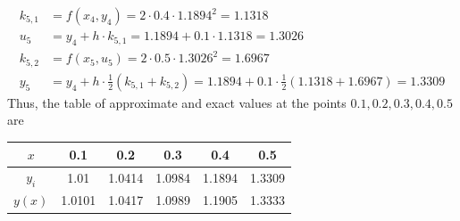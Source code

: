 \documentclass{article}
\begin{document}
\begin{enumerate}
\begin{enumerate}[(a)]
\begin{soln}
\begin{align*}
						k_{5, 1} &= f(x_4, y_4) = 2\cdot 0.4\cdot 1.1894^2 = 1.1318 \\
						u_5 &= y_4 + h\cdot k_{5, 1} = 1.1894 + 0.1\cdot 1.1318 = 1.3026 \\
						k_{5, 2} &= f(x_5, u_5) = 2\cdot 0.5\cdot 1.3026^2 = 1.6967 \\
						y_5 &= y_4 + h\cdot \frac{1}{2}\left( k_{5, 1} + k_{5, 2} \right) = 1.1894 + 0.1\cdot \frac{1}{2}\left( 1.1318 + 1.6967 \right) = 1.3309
					\end{align*}
					Thus, the table of approximate and exact values at the points $0.1, 0.2, 0.3, 0.4, 0.5$ are
					\begin{center}
						\begin{tabular}{c||c|c|c|c|c}
							$x$ & 0.1 & 0.2 & 0.3 & 0.4 & 0.5 \\
							\hline
							$y_i$ & 1.01 & 1.0414 & 1.0984 & 1.1894 & 1.3309 \\
							\hline 
							$y(x)$ & 1.0101 & 1.0417 & 1.0989 & 1.1905 & 1.3333
						\end{tabular}
					\end{center}
				\end{soln}

		\end{enumerate}

\end{enumerate}
\end{document}
